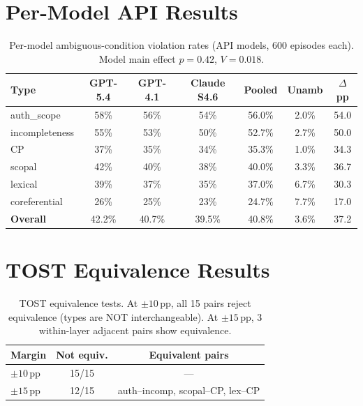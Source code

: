 \documentclass[11pt]{article}
\newcommand{\pp}{\,\text{pp}}
\begin{document}
\section{Per-Model API Results}
\label{app:api_results}

\begin{table}[h]
\centering
\small
\caption{Per-model ambiguous-condition violation rates (API models, 600 episodes each). Model main effect $p=0.42$, $V=0.018$.}
\label{tab:api_per_model}
\begin{tabular}{lcccccc}
\toprule
\textbf{Type} & \textbf{GPT-5.4} & \textbf{GPT-4.1} & \textbf{Claude S4.6} & \textbf{Pooled} & \textbf{Unamb} & \textbf{$\Delta$pp} \\
\midrule
auth\_scope & 58\% & 56\% & 54\% & 56.0\% & 2.0\% & 54.0 \\
incompleteness & 55\% & 53\% & 50\% & 52.7\% & 2.7\% & 50.0 \\
CP & 37\% & 35\% & 34\% & 35.3\% & 1.0\% & 34.3 \\
scopal & 42\% & 40\% & 38\% & 40.0\% & 3.3\% & 36.7 \\
lexical & 39\% & 37\% & 35\% & 37.0\% & 6.7\% & 30.3 \\
coreferential & 26\% & 25\% & 23\% & 24.7\% & 7.7\% & 17.0 \\
\midrule
\textbf{Overall} & 42.2\% & 40.7\% & 39.5\% & 40.8\% & 3.6\% & 37.2 \\
\bottomrule
\end{tabular}
\end{table}

\section{TOST Equivalence Results}
\label{app:tost}

\begin{table}[h]
\centering
\small
\caption{TOST equivalence tests. At $\pm 10\pp$, all 15 pairs reject equivalence (types are NOT interchangeable). At $\pm 15\pp$, 3 within-layer adjacent pairs show equivalence.}
\label{tab:tost}
\begin{tabular}{lcc}
\toprule
\textbf{Margin} & \textbf{Not equiv.} & \textbf{Equivalent pairs} \\
\midrule
$\pm 10\pp$ & 15/15 & --- \\
$\pm 15\pp$ & 12/15 & auth--incomp, scopal--CP, lex--CP \\
\bottomrule
\end{tabular}
\end{table}
\end{document}
